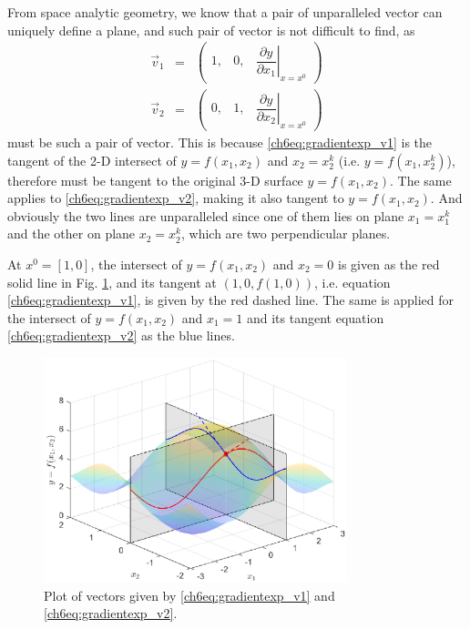 From space analytic geometry, we know that a pair of unparalleled vector can uniquely define a plane, and such pair of vector is not difficult to find, as
\begin{eqnarray}
 \vec{v}_1 &=& \left(\begin{array}{ccc}
                       1, & 0, & \left.\dfrac{\partial y}{\partial x_1}\right|_{x=x^0}
                     \end{array}\right) \label{ch6eq:gradientexp_v1} \\
 \vec{v}_2 &=& \left(\begin{array}{ccc}
                       0, & 1, & \left.\dfrac{\partial y}{\partial x_2}\right|_{x=x^0}
                     \end{array}\right) \label{ch6eq:gradientexp_v2}
\end{eqnarray}
must be such a pair of vector. This is because \eqref{ch6eq:gradientexp_v1} is the tangent of the 2-D intersect of $y=f(x_1,x_2)$ and $x_2 = x_2^k$ (i.e. $y=f(x_1,x_2^k)$), therefore must be tangent to the original 3-D surface $y=f(x_1,x_2)$. The same applies to \eqref{ch6eq:gradientexp_v2}, making it also tangent to $y=f(x_1,x_2)$. And obviously the two lines are unparalleled since one of them lies on plane $x_1=x_1^k$ and the other on plane $x_2=x_2^k$, which are two perpendicular planes.

At $x^0=[1,0]$, the intersect of $y=f(x_1,x_2)$ and $x_2 = 0$ is given as the red solid line in Fig. \ref{ch6fig:gradientexp_3d2}, and its tangent at $\left(1,0,f(1,0)\right)$, i.e. equation \eqref{ch6eq:gradientexp_v1}, is given by the red dashed line. The same is applied for the intersect of $y=f(x_1,x_2)$ and $x_1 = 1$ and its tangent equation \eqref{ch6eq:gradientexp_v2} as the blue lines.

\begin{figure}
	\centering
	\includegraphics[width=250pt]{chapters/chapter6/figures/gradientexp_3d2.eps}
	\caption{Plot of vectors given by \eqref{ch6eq:gradientexp_v1} and \eqref{ch6eq:gradientexp_v2}.} \label{ch6fig:gradientexp_3d2}
\end{figure}

